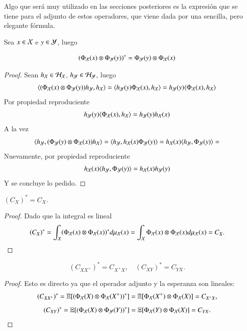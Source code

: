 Algo que será muy utilizado en las secciones posteriores es la expresión que se tiene para el adjunto de estos operadores, que viene dada por una sencilla, pero elegante fórmula.
	\begin{prop}
		Sea $x \in \mathcal{X}$ e $y \in \mathcal{Y}$, luego
		
		\begin{equation*}
			\left ( \Phi_{\mathcal{X}} (x) \otimes \Phi_{\mathcal{Y}} (y) \right )^* = \Phi_{\mathcal{Y}} (y) \otimes \Phi_{\mathcal{X}} (x)
		\end{equation*}
	\end{prop}
	\begin{proof}
		Sean $h_{\mathcal{X}} \in \mathcal{H}_{\mathcal{X}}$, $h_{\mathcal{Y}} \in \mathcal{H}_{\mathcal{Y}}$, luego
		\begin{equation*}
			\langle (\Phi_{\mathcal{X}} (x) \otimes \Phi_{\mathcal{Y}} (y)) h_{\mathcal{Y}}, h_{\mathcal{X}} \rangle = \langle h_{\mathcal{Y}} (y) \Phi_{\mathcal{X}} (x), h_{\mathcal{X}} \rangle = h_{\mathcal{Y}} (y) \langle \Phi_{\mathcal{X}} (x), h_{\mathcal{X}} \rangle
		\end{equation*}
		Por propiedad reproduciente
		\begin{equation*}
			h_{\mathcal{Y}} (y) \langle  \Phi_{\mathcal{X}} (x), h_{\mathcal{X}} \rangle = h_{\mathcal{Y}} (y) h_{\mathcal{X}} (x)
		\end{equation*}
		A la vez
		\begin{equation*}
			\langle h_{\mathcal{Y}}, (\Phi_{\mathcal{Y}} (y) \otimes \Phi_{\mathcal{X}} (x)) h_{\mathcal{X}} \rangle = \langle h_{\mathcal{Y}}, h_{\mathcal{X}} (x) \Phi_{\mathcal{Y}} (y) \rangle = h_{\mathcal{X}} (x) 
			\langle h_{\mathcal{Y}}, \Phi_{\mathcal{Y}} (y) \rangle =
		\end{equation*}
		Nuevamente, por propiedad reproduciente
		\begin{equation*}
			h_{\mathcal{X}} (x) 
			\langle h_{\mathcal{Y}}, \Phi_{\mathcal{Y}} (y) \rangle =h_{\mathcal{X}} (x) h_{\mathcal{Y}} (y) 
		\end{equation*}
		Y se concluye lo pedido.
	\end{proof}
	
	\begin{cor} $(C_{X})^* = C_X$.
        \label{cor:CX_autoad}
	\end{cor}
    \begin{proof}
        Dado que la integral es lineal
	\begin{equation*}
		(C_X)^* = \int_{\mathcal{X}} (\Phi_{\mathcal{X}} (x) \otimes \Phi_{\mathcal{X}} (x))^* d \mu_{\mathcal{X}} (x) = \int_{\mathcal{X}} \Phi_{\mathcal{X}} (x) \otimes \Phi_{\mathcal{X}} (x) d \mu_{\mathcal{X}} (x) = C_X.
	\end{equation*}
    \end{proof}
	
    \begin{cor}
        \begin{equation*}
            (C_{XX^+})^* = C_{X^+X}, \quad (C_{XY})^* = C_{YX}.
        \end{equation*}
    \end{cor}
    \begin{proof}
        Esto es directo ya que el operador adjunto y la esperanza son lineales:
\begin{equation*}
    (C_{X X^+})^* = \mathbb{E} [(\Phi_{\mathcal{X}} (X) \otimes \Phi_{\mathcal{X}} (X^+))^*] = \mathbb{E} [\Phi_{\mathcal{X}} (X^+) \otimes \Phi_{\mathcal{X}} (X)] = C_{X^+X},
\end{equation*}
\begin{equation*}
    (C_{X Y})^* = \mathbb{E} [(\Phi_{\mathcal{X}} (X) \otimes \Phi_{\mathcal{Y}} (Y))^*] = \mathbb{E} [\Phi_{\mathcal{X}} (Y) \otimes \Phi_{\mathcal{X}} (X)] = C_{YX}.
\end{equation*}
    \end{proof}
	
